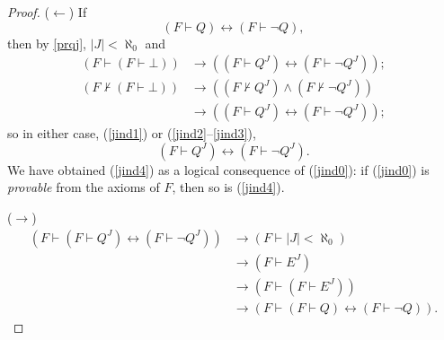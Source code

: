 \documentclass[letterpaper]{article}
\newcommand{\Lemma}{{\large\FlatSteel}}
\begin{document}
\begin{proof}
($\longleftarrow$) If 
\begin{equation}\label{jind0}
	(F\vdash Q)\longleftrightarrow(F\vdash\lnot Q),
\end{equation}
then by \Lemma \ref{prqj}, $|J|<\aleph_0$ and
\begin{align}\label{jind1}
(F\vdash(F\vdash\bot))&\longrightarrow((F\vdash Q^J)\longleftrightarrow(F\vdash\lnot Q^J));\\
(F\nvdash(F\vdash\bot))&\longrightarrow ((F\nvdash Q^J)\land(F\nvdash\lnot Q^J))\label{jind2}\\
&\longrightarrow ((F\vdash Q^J)\longleftrightarrow(F\vdash\lnot Q^J));\label{jind3}
\end{align}
so in either case, (\ref{jind1}) or (\ref{jind2}--\ref{jind3}),
\begin{equation}
(F\vdash Q^J)\longleftrightarrow(F\vdash\lnot Q^J).\label{jind4}
\end{equation}
We have obtained (\ref{jind4}) as a logical consequence of (\ref{jind0}): if (\ref{jind0}) is \textit{provable} from the axioms of $F$, then so is (\ref{jind4}).

($\longrightarrow$)
\begin{align}
	(F\vdash(F\vdash Q^J)\longleftrightarrow(F\vdash\lnot Q^J))
	&\longrightarrow (F\vdash |J|<\aleph_0)\\
	&\longrightarrow (F\vdash E^J)\\
	&\longrightarrow (F\vdash(F\vdash E^J))\\
	&\longrightarrow(F\vdash(F\vdash Q)\longleftrightarrow(F\vdash\lnot Q)).
\end{align}
\end{proof}
\end{document}
